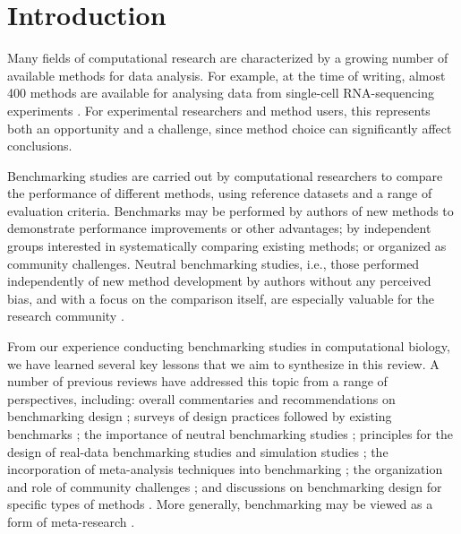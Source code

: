\section{Introduction}

Many fields of computational research are characterized by a growing number of available methods for data analysis. For example, at the time of writing, almost 400 methods are available for analysing data from single-cell RNA-sequencing experiments \cite{zappia_exploringsinglecellrnaseq_2018}. For experimental researchers and method users, this represents both an opportunity and a challenge, since method choice can significantly affect conclusions.

Benchmarking studies are carried out by computational researchers to compare the performance of different methods, using reference datasets and a range of evaluation criteria. Benchmarks may be performed by authors of new methods to demonstrate performance improvements or other advantages; by independent groups interested in systematically comparing existing methods; or organized as community challenges. Neutral benchmarking studies, i.e., those performed independently of new method development by authors without any perceived bias, and with a focus on the comparison itself, are especially valuable for the research community \cite{boulesteix_necessitydesignstudies_2018,boulesteix_pleaneutralcomparison_2013}.

From our experience conducting benchmarking studies in computational biology, we have learned several key lessons that we aim to synthesize in this review. A number of previous reviews have addressed this topic from a range of perspectives, including: overall commentaries and recommendations on benchmarking design \cite{boulesteix_necessitydesignstudies_2018,peters_puttingbenchmarkstheir_2018,boulesteix_tensimplerules_2015,zheng_benchmarkingcontextsdetails_2017,mangul_systematicbenchmarkingomics_2019,norel_selfassessmenttrapcan_2011,aniba_issuesbioinformaticsbenchmarking_2010}; surveys of design practices followed by existing benchmarks \cite{mangul_systematicbenchmarkingomics_2019}; the importance of neutral benchmarking studies \cite{boulesteix_pleaneutralcomparison_2013}; principles for the design of real-data benchmarking studies \cite{boulesteix_evidencebasedcomputationalstatistics_2017,boulesteix_statisticalframeworkhypothesis_2015} and simulation studies \cite{morris_usingsimulationstudies_2019}; the incorporation of meta-analysis techniques into benchmarking \cite{gardner_identifyingaccuratemetagenome_2019,gardner_metaanalysisbioinformaticssoftware_2017,evangelou_metaanalysismethodsgenomewide_2013,hong_comparisonmetaanalysismethods_2008}; the organization and role of community challenges \cite{boutros_betterbenchmarkingchallengebased_2014,friedberg_tensimplerules_2015}; and discussions on benchmarking design for specific types of methods \cite{vanmechelen_benchmarkingclusteranalysis_2018,angers-loustau_challengesdesigningbenchmark_2018}. More generally, benchmarking may be viewed as a form of meta-research \cite{ioannidis_metaresearchwhyresearch_2018}.

